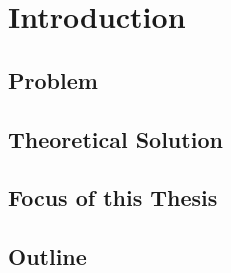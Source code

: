 \chapter{Introduction}

\section{Problem}

\section{Theoretical Solution}

\section{Focus of this Thesis}

\section{Outline}